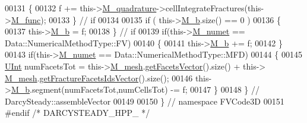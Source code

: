 \begin{DoxyCode}
00131     \{
00132         f += this->\hyperlink{classFVCode3D_1_1Problem_ace5ff91974a55df1e4cbc6ef879f790f}{M\_quadrature}->cellIntegrateFractures(this->\hyperlink{classFVCode3D_1_1Problem_a8d2a09d302c312ce0fadb00b8ac7ecf7}{M\_func});
00133     \} \textcolor{comment}{// if}
00134 
00135     \textcolor{keywordflow}{if} ( this->\hyperlink{classFVCode3D_1_1Problem_a65a00ab96a21f389f50f273614f977d4}{M\_b}.size() == 0 )
00136     \{
00137         this->\hyperlink{classFVCode3D_1_1Problem_a65a00ab96a21f389f50f273614f977d4}{M\_b} = f;
00138     \} \textcolor{comment}{// if}
00139     \textcolor{keywordflow}{if}(this->\hyperlink{classFVCode3D_1_1Problem_a2ed1b05f24ab6100c6a389e22df7e098}{M\_numet} == Data::NumericalMethodType::FV)
00140     \{
00141                 this->\hyperlink{classFVCode3D_1_1Problem_a65a00ab96a21f389f50f273614f977d4}{M\_b} += f;
00142                 \}
00143     \textcolor{keywordflow}{if}(this->\hyperlink{classFVCode3D_1_1Problem_a2ed1b05f24ab6100c6a389e22df7e098}{M\_numet} == Data::NumericalMethodType::MFD)
00144     \{
00145                 \hyperlink{namespaceFVCode3D_a4bf7e328c75d0fd504050d040ebe9eda}{UInt} numFacetsTot = this->\hyperlink{classFVCode3D_1_1Problem_aa3c9a2cf8ccd899314cf22d907a0041f}{M\_mesh}.\hyperlink{classFVCode3D_1_1Rigid__Mesh_a6d3cdd4ef8a5225599953179d5302636}{getFacetsVector}().size() + this->
      \hyperlink{classFVCode3D_1_1Problem_aa3c9a2cf8ccd899314cf22d907a0041f}{M\_mesh}.\hyperlink{classFVCode3D_1_1Rigid__Mesh_aadbe6d9ad704122537903396d91238e0}{getFractureFacetsIdsVector}().size();
00146         this->\hyperlink{classFVCode3D_1_1Problem_a65a00ab96a21f389f50f273614f977d4}{M\_b}.segment(numFacetsTot,numCellsTot) -= f;
00147     \} 
00148 \} \textcolor{comment}{// DarcySteady::assembleVector}
00149 
00150 \} \textcolor{comment}{// namespace FVCode3D}
00151 \textcolor{preprocessor}{#endif }\textcolor{comment}{/* DARCYSTEADY\_HPP\_ */}\textcolor{preprocessor}{}
\end{DoxyCode}
